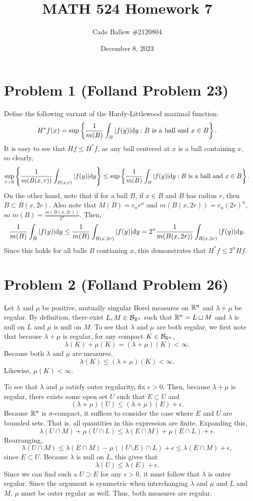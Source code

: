\documentclass{article}
\title{MATH 524 Homework 7}
\author{Cade Ballew \#2120804}
\date{December 8, 2023}
\begin{document}
	
\maketitle
	
\section{Problem 1 (Folland Problem 23)}
Define the following variant of the Hardy-Littlewood maximal function:
\[
H^* f(x)=\sup \left\{\frac{1}{m(B)} \int_B|f(y)| \mathrm{d} y: B \text { is a ball and } x \in B\right\}.
\]
It is easy to see that $Hf\leq H^*f$, as any ball centered at $x$ is a ball containing $x$, so clearly,
\[
\sup_{r>0}\left\{\frac{1}{m(B(x,r))}\int_{B(x,r)}|f(y)|\mathrm{d} y\right\}\leq\sup\left\{\frac{1}{m(B)} \int_B|f(y)| \mathrm{d} y: B \text { is a ball and } x \in B\right\}.
\]
On the other hand, note that if for a ball $B$, if $x\in B$ and $B$ has radius $r$, then $B\subset B(x,2r)$. Also note that $M(B)=c_nr^n$ and $m(B(x,2r))=c_n(2r)^n$, so $m(B)=\frac{m(B(x,2r))}{2^n}$. Then,
\begin{align*}
\frac{1}{m(B)} \int_B|f(y)| \mathrm{d} y\leq\frac{1}{m(B)} \int_{B(x,2r)}|f(y)| \mathrm{d} y=2^n\frac{1}{m(B(x,2r))} \int_{B(x,2r)}|f(y)| \mathrm{d} y.
\end{align*}
Since this holds for all balls $B$ contianing $x$, this demonstrates that $H^*f\leq 2^n Hf$. 

\section{Problem 2 (Folland Problem 26)}
Let $\lambda$ and $\mu$ be positive, mutually singular Borel measures on $\mathbb{R}^n$ and $\lambda+\mu$ be regular. By definition, there exist $L,M\in{\cal B}_{\mathbb{R}^n}$ such that $\mathbb{R}^n=L\sqcup M$ and $\lambda$ is null on $L$ and $\mu$ is null on $M$. To see that $\lambda$ and $\mu$ are both regular, we first note that because $\lambda+\mu$ is regular, for any compact $K\in{\cal B}_{\mathbb{R}^n}$,
\[
\lambda(K)+\mu(K)=(\lambda+\mu)(K)<\infty.
\]
Because both $\lambda$ and $\mu$ are measures,
\[
\lambda(K)\leq(\lambda+\mu)(K)<\infty.
\]
Likewise, $\mu(K)<\infty$. 

To see that $\lambda$ and $\mu$ satisfy outer regularity,  fix $\epsilon>0$. Then, because $\lambda+\mu$ is regular, there exists some open set $U$ such that $E\subset U$ and 
\[
(\lambda+\mu)(U)\leq(\lambda+\mu)(E)+\epsilon.
\]
Because $\mathbb{R}^n$ is $\sigma$-compact, it suffices to consider the case where $E$ and $U$ are bounded sets. That is, all quantities in this expression are finite. Expanding this,
\[
\lambda(U\cap M)+\mu(U\cap L)\leq\lambda(E\cap M)+\mu(E\cap L)+\epsilon. 
\]
Rearranging,
\[
\lambda(U\cap M)\leq\lambda(E\cap M)-\mu\left((U\setminus E)\cap L\right)+\epsilon\leq \lambda(E\cap M)+\epsilon, 
\]
since $E\subset U$. Because $\lambda$ is null on $L$, this gives that
\[
\lambda(U)\leq\lambda(E)+\epsilon.
\]
Since we can find such a $U\supset E$ for any $\epsilon>0$, it must follow that $\lambda$ is outer regular. Since the argument is symmetric when interchanging $\lambda$ and $\mu$ and $L$ and $M$, $\mu$ must be outer regular as well. Thus, both measures are regular.
\end{document}
